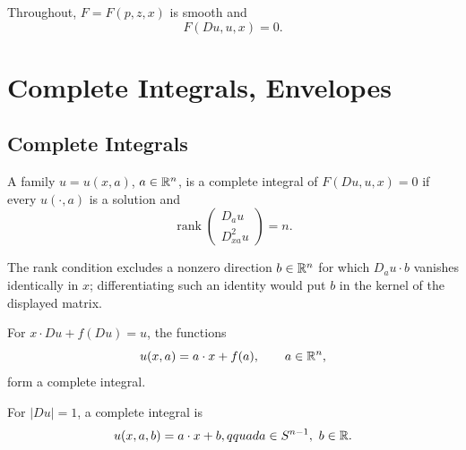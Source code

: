 Throughout, $F=F(p,z,x)$ is smooth and
\[
F(Du,u,x)=0.
\]

\section{Complete Integrals, Envelopes}
\label{sec:complete-integrals-envelopes}

\subsection{Complete Integrals}
\label{sec:complete-integrals}

\begin{definition}
\label{def:complete-integral}
A family $u=u(x,a)$, $a\in\mathbb{R}^n$, is a complete integral of
$F(Du,u,x)=0$ if every $u(\cdot,a)$ is a solution and
\[
\operatorname{rank}
\begin{pmatrix}D_a u\\D^2_{xa}u\end{pmatrix}=n.
\]
\end{definition}

\begin{remark}
\label{rem:complete-integral-independence}

The rank condition excludes a nonzero direction $b\in\mathbb{R}^n$ for which
$D_a u\cdot b$ vanishes identically in $x$; differentiating such an identity
would put $b$ in the kernel of the displayed matrix.
\end{remark}

\begin{example}
\label{ex:clairaut-complete-integral}

For $x\cdot Du+f(Du)=u$, the functions
\[
u(x,a)=a\cdot x+f(a),\qquad a\in\mathbb{R}^n,
\]
form a complete integral.
\end{example}

\begin{example}
\label{ex:eikonal-complete-integral}

For $|Du|=1$, a complete integral is
\[
u(x,a,b)=a\cdot x+b,qquad a\in S^{n-1},\ b\in\mathbb{R}.
\]
\end{example}

